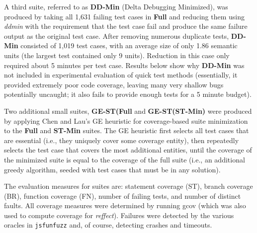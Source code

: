 A third suite, referred to as {\bf DD-Min} (Delta Debugging
Minimized), was produced by taking all 1,631 failing test cases in
{\bf Full} and reducing them using \emph{ddmin} with the requirement
that the test case fail and produce the same failure output as the
original test case.  After removing numerous duplicate tests, {\bf
DD-Min} consisted of 1,019 test cases, with an average size of only
1.86 semantic units (the largest test contained only 9 units).
Reduction in this case only required about 5 minutes per test case.
Results below show why {\bf DD-Min} was not included in experimental
evaluation of quick test methods (essentially, it provided extremely
poor code coverage, leaving many very shallow bugs potentially
uncaught; it also fails to provide enough tests for a 5 minute
budget).

Two additional small suites, {\bf GE-ST(Full} and {\bf GE-ST(ST-Min)} were
produced by applying Chen and Lau's GE heuristic \cite{ChenLau} for
coverage-based suite minimization to the {\bf Full} and {\bf ST-Min}
suites.  The GE heuristic first selects all test cases that are
essential (i.e., they uniquely cover some coverage entity), then
repeatedly selects the test case that covers the most additional
entities, until the coverage of the minimized suite is equal to the
coverage of the full suite (i.e., an additional greedy algorithm,
seeded with test cases that must be in any solution).

The evaluation measures for suites are: statement coverage (ST),
branch coverage (BR), function coverage (FN), number of failing tests,
and number of distinct faults.  All coverage measures were determined
by running gcov (which was also used to compute coverage for
\emph{reffect}).  Failures were detected by the various oracles in
\texttt{jsfunfuzz} and, of course, detecting crashes and timeouts.

